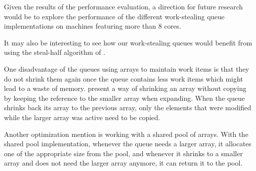 Given the results of the performance evaluation, a direction for
future research would be to explore the performance of the different
work-stealing queue implementations on machines featuring more than 8
cores.

It may also be interesting to see how our work-stealing queues would
benefit from using the steal-half algorithm of \textcite{Hendler2002}.

One disadvantage of the queues using arrays to maintain work items is
that they do not shrink them again once the queue contains less work
items which might lead to a waste of memory. \textcite{Chase2005}
present a way of shrinking an array without copying by keeping the
reference to the smaller array when expanding. When the queue shrinks
back its array to the previous array, only the elements that were
modified while the larger array was active need to be copied.

Another optimization \textcite{Chase2005} mention is working with a
shared pool of arrays. With the shared pool implementation, whenever
the queue needs a larger array, it allocates one of the appropriate
size from the pool, and whenever it shrinks to a smaller array and
does not need the larger array anymore, it can return it to the pool.


